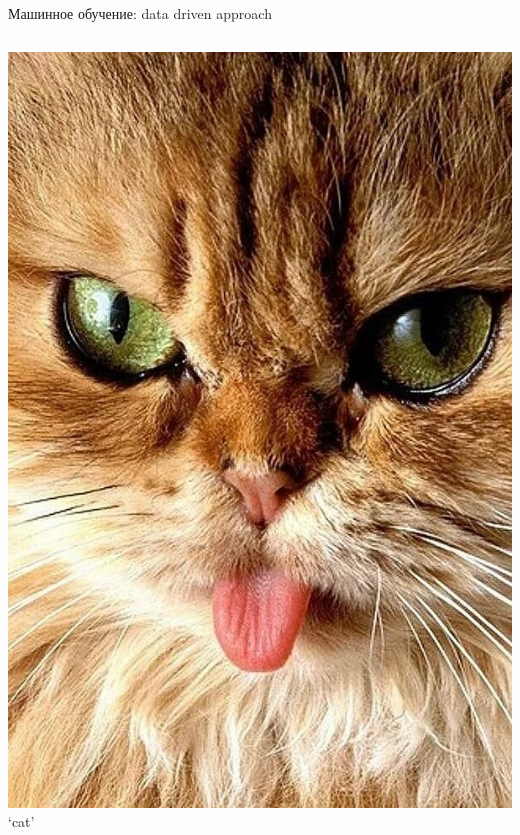 \documentclass[aspectratio=169, professionalfonts]{beamer}
\begin{document}
\begin{frame}{Машинное обучение: data driven approach}
\begin{columns}
\begin{column}{.1\linewidth}
            \includegraphics[width=\linewidth]{figures/fig37-dataset-sample.jpg}
            `cat'
        \end{column}
    \end{columns}
\end{frame}
\end{document}
